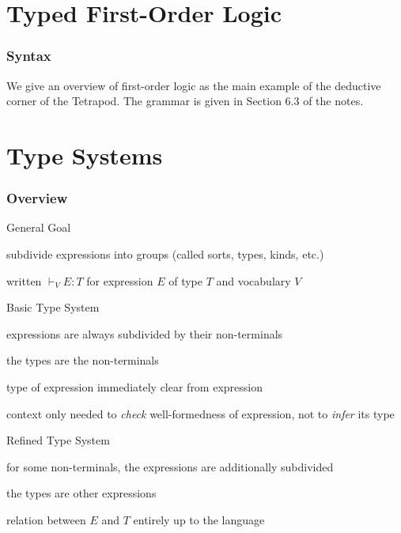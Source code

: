 \section{Typed First-Order Logic}

\begin{frame}\frametitle{Syntax}
We give an overview of first-order logic as the main example of the deductive corner of the Tetrapod.
The grammar is given in Section 6.3 of the notes.
\end{frame}

\section{Type Systems}

\begin{frame}\frametitle{Overview}
\begin{blockitems}{General Goal}
\item subdivide expressions into groups (called sorts, types, kinds, etc.)
\item written $\vdash_V E:T$ for expression $E$ of type $T$ and vocabulary $V$
\end{blockitems}

\begin{blockitems}{Basic Type System}
\item expressions are always subdivided by their non-terminals
\item the types are the non-terminals
\item type of expression immediately clear from expression
\item context only needed to \emph{check} well-formedness of expression, not to \emph{infer} its type
\end{blockitems}

\begin{blockitems}{Refined Type System}
\item for some non-terminals, the expressions are additionally subdivided
\item the types are other expressions
\item relation between $E$ and $T$ entirely up to the language
\end{blockitems}
\end{frame}

